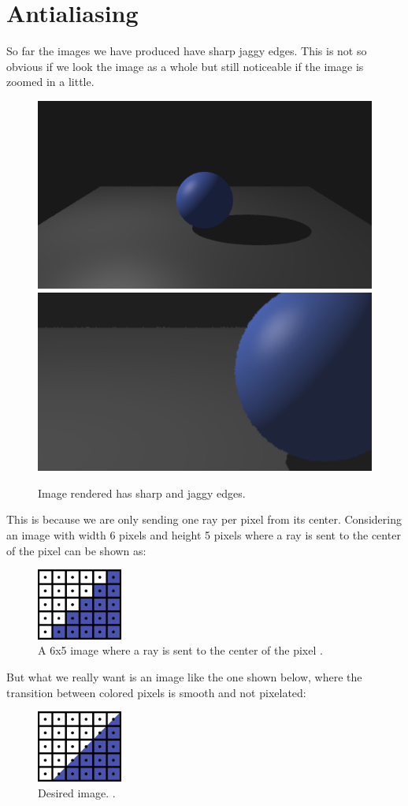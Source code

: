\documentclass[11pt,a4paper]{article}
\begin{document}
	\section{Antialiasing}
	So far the images we have produced have sharp jaggy edges. This is not so obvious if we look the image as a whole but still noticeable if the image is zoomed in a little.
	\begin{figure}[H]
		\centering
		\captionsetup{justification=centering}
		\includegraphics[width=.45\textwidth]{aliased_pointlight.png}\quad
		\includegraphics[width=.47\textwidth]{aliased_pointlight_zoomed.png}\quad
		\caption{Image rendered has sharp and jaggy edges.}
	\end{figure}
	\noindent
	This is because we are only sending one ray per pixel from its center. Considering an image with width 6 pixels and height 5 pixels where a ray is sent to the center of the pixel can be shown as:
	\begin{figure}[H]
		\centering
		\captionsetup{justification=centering}
		\includegraphics[width=0.25\textwidth]{antialiasing_1.png}\quad
		\caption{A 6x5 image where a ray is sent to the center of the pixel \protect\cite{suffern2016ray}.}
	\end{figure}
	\noindent
	But what we really want is an image like the one shown below, where the transition between colored pixels is smooth and not pixelated:
	\begin{figure}[H]
		\centering
		\captionsetup{justification=centering}
		\includegraphics[width=0.25\textwidth]{antialiasing_2.png}\quad
		\caption{Desired image. \protect\cite{suffern2016ray}.}
	\end{figure}
\end{document}
